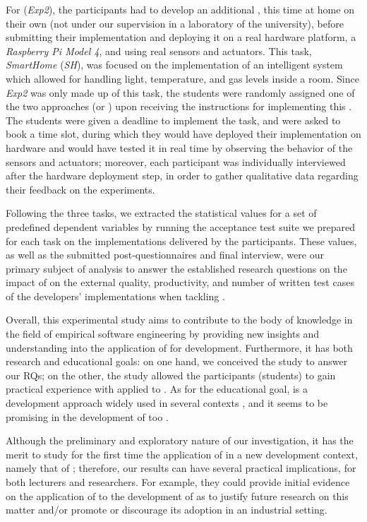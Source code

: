 For (\textit{Exp2}), the participants had to develop an additional \es, this time at home on their own (\ie not under our supervision in a laboratory of the university), before submitting their implementation and deploying it on a real hardware platform, a \textit{Raspberry Pi Model 4}, and using real sensors and actuators. This task, \textit{SmartHome} (\textit{SH}), was focused on the implementation of an intelligent system which allowed for handling light, temperature, and gas levels inside a room.
Since \textit{Exp2} was only made up of this task, the students were randomly assigned one of the two approaches (\ie \tdd or \notdd) upon receiving the instructions for implementing this \es.
The students were given a deadline to implement the task, and were asked to book a time slot, during which they would have deployed their implementation on hardware and would have tested it in real time by observing the behavior of the sensors and actuators; moreover, each participant was individually interviewed after the hardware deployment step, in order to gather qualitative data regarding their feedback on the experiments.

Following the three tasks, we extracted the statistical values for a set of predefined dependent variables by running the acceptance test suite we prepared for each task on the implementations delivered by the participants. These values, as well as the submitted post-questionnaires and final interview, were our primary subject of analysis to answer the established research questions on the impact of \tdd on the external quality, productivity, and number of written test cases of the developers' implementations when tackling \ess.

Overall, this experimental study aims to contribute to the body of knowledge in the field of empirical software engineering by providing new insights and understanding into the application of \tdd for \es development. Furthermore, it has both research and educational goals: on one hand, we conceived the study to answer our RQs; on the other, the study allowed the participants (students) to gain practical experience with \tdd applied to \ess. As for the educational goal, \tdd is a development approach widely used in several contexts \cite{DBLP:conf/esem/RomanoZBPS22}, and it seems to be promising in the development of \ess too \cite{TDDEC}.

Although the preliminary and exploratory nature of our investigation, it has the merit to study for the first time the application of \tdd in a new development context, namely that of \ess; therefore, our results can have several practical implications, for both lecturers and researchers. For example, they could provide initial evidence on the application of \tdd to the development of \ess as to justify future research on this matter and/or promote or discourage its adoption in an industrial setting.



